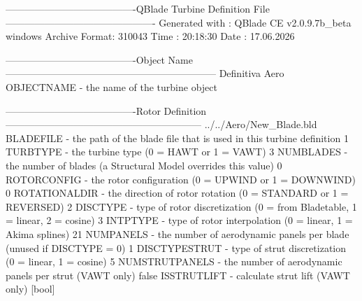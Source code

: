 \begin{cfgcode}
----------------------------------------QBlade Turbine Definition File----------------------------------------------
Generated with : QBlade CE v2.0.9.7b_beta windows
Archive Format: 310043
Time : 20:18:30
Date : 17.06.2026

----------------------------------------Object Name-----------------------------------------------------------------
Definitiva Aero                                    OBJECTNAME         - the name of the turbine object

----------------------------------------Rotor Definition------------------------------------------------------------
../../Aero/New_Blade.bld                                 BLADEFILE          - the path of the blade file that is used in this turbine definition
1                                                  TURBTYPE           - the turbine type (0 = HAWT or 1 = VAWT)
3                                                  NUMBLADES          - the number of blades (a Structural Model overrides this value)
0                                                  ROTORCONFIG        - the rotor configuration (0 = UPWIND or 1 = DOWNWIND)
0                                                  ROTATIONALDIR      - the direction of rotor rotation (0 = STANDARD or 1 = REVERSED)
2                                                  DISCTYPE           - type of rotor discretization (0 = from Bladetable, 1 = linear, 2 = cosine) 
3                                                  INTPTYPE           - type of rotor interpolation (0 = linear, 1 = Akima splines) 
21                                                 NUMPANELS          - the number of aerodynamic panels per blade (unused if DISCTYPE = 0)
1                                                  DISCTYPESTRUT      - type of strut discretization (0 = linear, 1 = cosine) 
5                                                  NUMSTRUTPANELS     - the number of aerodynamic panels per strut (VAWT only)
false                                              ISSTRUTLIFT        - calculate strut lift (VAWT only) [bool]


\end{cfgcode}
